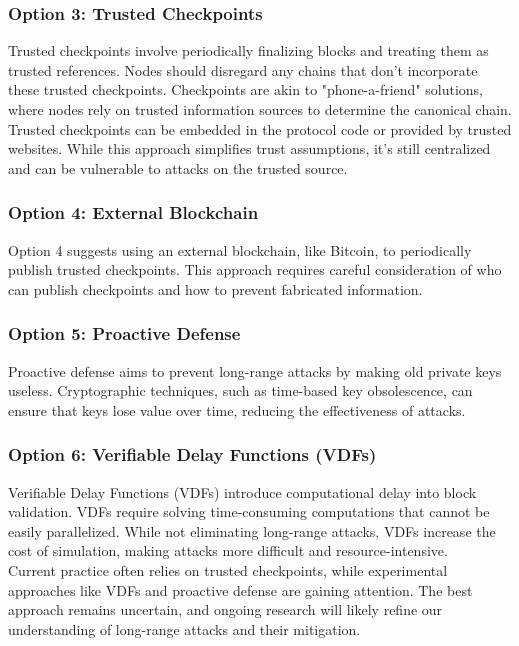 \subsubsection{Option 3: Trusted Checkpoints}
Trusted checkpoints involve periodically finalizing blocks and treating them as trusted references. Nodes should disregard any chains that don't incorporate these trusted checkpoints. Checkpoints are akin to "phone-a-friend" solutions, where nodes rely on trusted information sources to determine the canonical chain.\\
Trusted checkpoints can be embedded in the protocol code or provided by trusted websites. While this approach simplifies trust assumptions, it's still centralized and can be vulnerable to attacks on the trusted source.

\subsubsection{Option 4: External Blockchain}
Option 4 suggests using an external blockchain, like Bitcoin, to periodically publish trusted checkpoints. This approach requires careful consideration of who can publish checkpoints and how to prevent fabricated information.

\subsubsection{Option 5: Proactive Defense}
Proactive defense aims to prevent long-range attacks by making old private keys useless. Cryptographic techniques, such as time-based key obsolescence, can ensure that keys lose value over time, reducing the effectiveness of attacks.

\subsubsection{Option 6: Verifiable Delay Functions (VDFs)}
Verifiable Delay Functions (VDFs) introduce computational delay into block validation. VDFs require solving time-consuming computations that cannot be easily parallelized. While not eliminating long-range attacks, VDFs increase the cost of simulation, making attacks more difficult and resource-intensive.\\
Current practice often relies on trusted checkpoints, while experimental approaches like VDFs and proactive defense are gaining attention. The best approach remains uncertain, and ongoing research will likely refine our understanding of long-range attacks and their mitigation.


